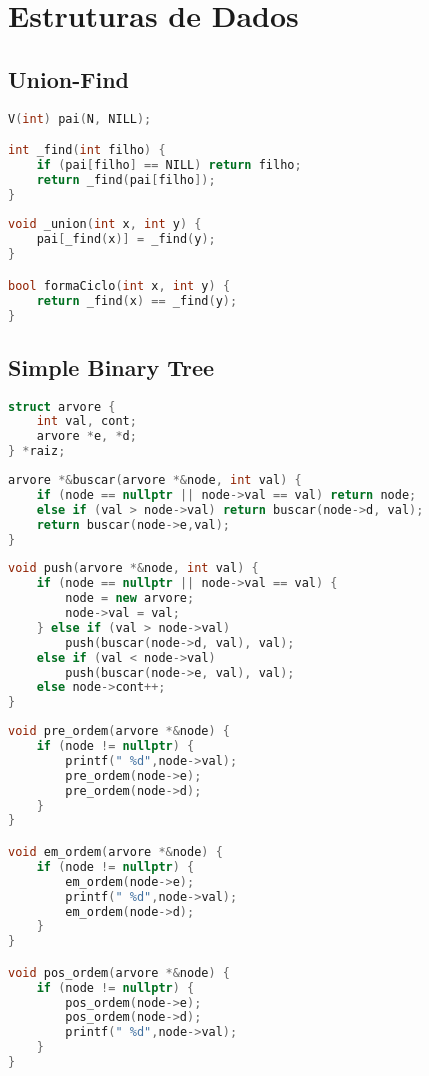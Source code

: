 \chapter{Estruturas de Dados}
\section{Union-Find}
\begin{lstlisting}[language=C++]
V(int) pai(N, NILL);

int _find(int filho) {
    if (pai[filho] == NILL) return filho;
    return _find(pai[filho]);
}
 
void _union(int x, int y) {
    pai[_find(x)] = _find(y);
}

bool formaCiclo(int x, int y) {
	return _find(x) == _find(y);
}
\end{lstlisting}

\section{Simple Binary Tree}
\begin{lstlisting}[language=C++, title={Estrutura da Árvore}]
struct arvore {
    int val, cont;
	arvore *e, *d;
} *raiz;
\end{lstlisting}

\begin{lstlisting}[language=C++, title=Retorna um nó com este valor ou nulo]
arvore *&buscar(arvore *&node, int val) {
    if (node == nullptr || node->val == val) return node;
    else if (val > node->val) return buscar(node->d, val);
    return buscar(node->e,val);
}
\end{lstlisting} 

\newpage
\begin{lstlisting}[language=C++, title=Adiciona um novo elemento]
void push(arvore *&node, int val) {
    if (node == nullptr || node->val == val) {
        node = new arvore;
        node->val = val;
    } else if (val > node->val) 
    	push(buscar(node->d, val), val);
    else if (val < node->val) 
    	push(buscar(node->e, val), val);   
    else node->cont++;
}
\end{lstlisting}
\begin{lstlisting}[language=C++, title=Percursos]
void pre_ordem(arvore *&node) {
    if (node != nullptr) {
        printf(" %d",node->val);
        pre_ordem(node->e); 
        pre_ordem(node->d);  
    }
}

void em_ordem(arvore *&node) {
    if (node != nullptr) {
        em_ordem(node->e);
        printf(" %d",node->val);
        em_ordem(node->d);  
    }
}

void pos_ordem(arvore *&node) {
    if (node != nullptr) {
        pos_ordem(node->e);
        pos_ordem(node->d);
        printf(" %d",node->val);    
    } 
}
\end{lstlisting}
\newpage

